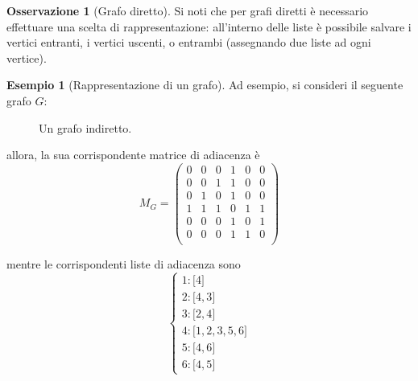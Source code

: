 \documentclass[14pt]{extreport}
\theoremstyle{definition}
\theoremstyle{definition}
\newtheorem{remark}{Osservazione}[subsection]
\newtheorem{example}{Esempio}[subsection]
\begin{document}
\begin{remark}[Grafo diretto]
    Si noti che per grafi diretti è necessario effettuare una scelta di rappresentazione: all'interno delle liste è possibile salvare i vertici entranti, i vertici uscenti, o entrambi (assegnando due liste ad ogni vertice).
\end{remark}

\begin{example}[Rappresentazione di un grafo]
    Ad esempio, si consideri il seguente grafo $G$:

    \begin{figure}[H]
        \centering
        \caption{Un grafo indiretto.}
    \end{figure}

    allora, la sua corrispondente matrice di adiacenza è
    $$M_G = \left( \begin{array}{llllll}
        0 & 0 & 0 & 1 & 0 & 0 \\
        0 & 0 & 1 & 1 & 0 & 0 \\
        0 & 1 & 0 & 1 & 0 & 0 \\
        1 & 1 & 1 & 0 & 1 & 1 \\
        0 & 0 & 0 & 1 & 0 & 1 \\
        0 & 0 & 0 & 1 & 1 & 0 \\
    \end{array} \right)$$

    mentre le corrispondenti liste di adiacenza sono $$\left \{ \begin{array}{l} 1: \texttt{[}4\texttt{]} \\ 2: \texttt{[}4, 3\texttt{]} \\ 3: \texttt{[}2, 4\texttt{]} \\ 4: \texttt{[}1, 2, 3, 5, 6\texttt{]} \\ 5: \texttt{[}4, 6\texttt{]} \\ 6: \texttt{[}4, 5\texttt{]} \end{array} \right.$$
\end{example}
\end{document}
